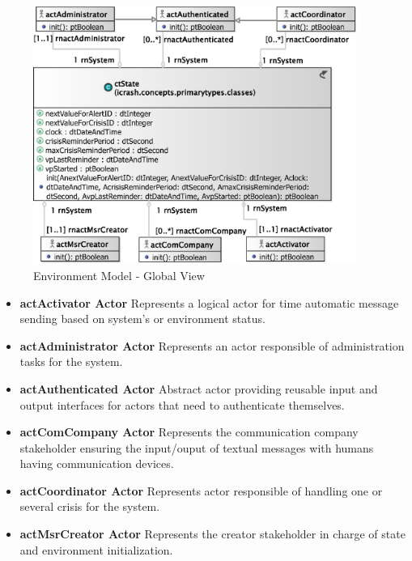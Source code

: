 \begin{figure}[H]
\begin{center}
  \includegraphics[width=400px]{images/analysis/environment-model/global/em-gv-01.eps}
  \caption{Environment Model - Global View}
  \label{fig:environmentGlobal}
\end{center}
\end{figure}

\begin{itemize}
	\item \textbf{actActivator Actor}
	Represents a logical actor for time automatic message sending based on system’s
	or environment status.
	
	\item \textbf{actAdministrator Actor}
	Represents an actor responsible of administration tasks for the \msricrash
	system. 
	
	\item \textbf{actAuthenticated Actor}
	Abstract actor providing reusable input and output interfaces for actors that
	need to authenticate themselves.
	
	\item \textbf{actComCompany Actor}
	Represents the communication company stakeholder ensuring the input/ouput of
	textual messages with humans having communication devices.
	
	\item \textbf{actCoordinator Actor}
	Represents actor responsible of handling one or several crisis for the
	\msricrash system.
	
	\item \textbf{actMsrCreator Actor}
	Represents the creator stakeholder in charge of state and environment
	initialization.

\end{itemize}

